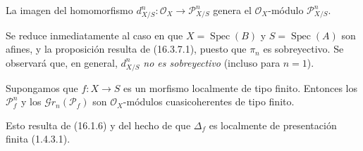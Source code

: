 \begin{proposition}[16.3.8]
\label{IV.16.3.8}
La imagen del homomorfismo $d_{X/S}^n:\mathcal{O}_X\to\mathscr{P}_{X/S}^n$
genera el $\mathcal{O}_X$-módulo $\mathscr{P}_{X/S}^n$.
\end{proposition}

Se reduce inmediatamente al caso en que $X=\operatorname{Spec}(B)$ y
$S=\operatorname{Spec}(A)$ son afines, y la proposición resulta de (16.3.7.1),
puesto que $\pi_n$ es sobreyectivo. Se observará que, en general, $d_{X/S}^n$ \emph{no es
sobreyectivo} (incluso para $n=1$).

\begin{proposition}[16.3.9]
\label{IV.16.3.9}
Supongamos que $f:X\to S$ es un morfismo localmente de tipo finito. Entonces los
$\mathscr{P}_f^n$ y los $\mathscr{G}r_n(\mathscr{P}_f)$ son
$\mathcal{O}_X$-módulos cuasicoherentes de tipo finito.
\end{proposition}

Esto resulta de (16.1.6) y del hecho de que $\Delta_f$ es localmente de presentación
finita (1.4.3.1).
